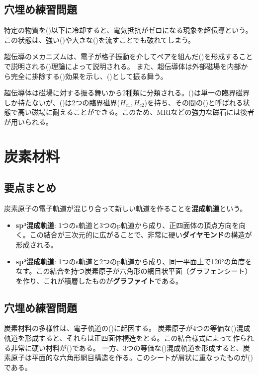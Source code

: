 \documentclass[11pt,a4paper]{ltjsarticle}
\newcommand{\blank}[1][3cm]{\underline{\hspace{#1}}}
\begin{document}
\subsection{穴埋め練習問題}
特定の物質を(\blank[2cm])以下に冷却すると、電気抵抗がゼロになる現象を超伝導という。この状態は、強い(\blank[1.5cm])や大きな(\blank[2cm])を流すことでも破れてしまう。

超伝導のメカニズムは、電子が格子振動を介してペアを組んだ(\blank[2.5cm])を形成することで説明される(\blank[1.5cm])理論によって説明される。
また、超伝導体は外部磁場を内部から完全に排除する(\blank[2.5cm])効果を示し、(\blank[2.5cm])として振る舞う。

超伝導体は磁場に対する振る舞いから2種類に分類される。(\blank[2.5cm])は単一の臨界磁界しか持たないが、(\blank[2.5cm])は2つの臨界磁界($H_{c1}, H_{c2}$)を持ち、その間の(\blank[2cm])と呼ばれる状態で高い磁場に耐えることができる。このため、MRIなどの強力な磁石には後者が用いられる。


\section{炭素材料}
\subsection{要点まとめ}
炭素原子の電子軌道が混じり合って新しい軌道を作ることを\textbf{混成軌道}という。
\begin{itemize}
    \item \textbf{sp³混成軌道}: 1つのs軌道と3つのp軌道から成り、正四面体の頂点方向を向く。この結合が三次元的に広がることで、非常に硬い\textbf{ダイヤモンド}の構造が形成される。
    \item \textbf{sp²混成軌道}: 1つのs軌道と2つのp軌道から成り、同一平面上で120°の角度をなす。この結合を持つ炭素原子が六角形の網目状平面（グラフェンシート）を作り、これが積層したものが\textbf{グラファイト}である。
\end{itemize}

\subsection{穴埋め練習問題}
炭素材料の多様性は、電子軌道の(\blank)に起因する。
炭素原子が4つの等価な(\blank[2cm])混成軌道を形成すると、それらは正四面体構造をとる。この結合様式によって作られる非常に硬い材料が(\blank)である。
一方、3つの等価な(\blank[2cm])混成軌道を形成すると、炭素原子は平面的な六角形網目構造を作る。このシートが層状に重なったものが(\blank)である。
\end{document}
